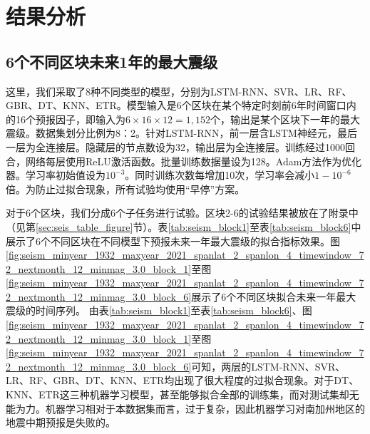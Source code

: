 \section{结果分析}\label{sec:seism_result}

\subsection{6个不同区块未来1年的最大震级}\label{sec:seism_result_6}

这里，我们采取了8种不同类型的模型，分别为LSTM-RNN、SVR、LR、RF、GBR、DT、KNN、ETR。模型输入是6个区块在某个特定时刻前6年时间窗口内的16个预报因子，即输入为$6\times 16\times 12=1,152$个，输出是某个区块下一年的最大震级。数据集划分比例为8：2。针对LSTM-RNN，前一层含LSTM神经元，最后一层为全连接层。隐藏层的节点数设为32，输出层为全连接层。训练经过1000回合，网络每层使用ReLU激活函数。批量训练数据量设为128。Adam方法作为优化器。学习率初始值设为$10^{-3}$。同时训练次数每增加10次，学习率会减小$1-10^{-6}$倍。为防止过拟合现象，所有试验均使用“早停”方案。

对于6个区块，我们分成6个子任务进行试验。区块2-6的试验结果被放在了附录中（见第\ref{sec:seis_table_figure}节）。表\ref{tab:seism_block1}至表\ref{tab:seism_block6}中展示了6个不同区块在不同模型下预报未来一年最大震级的拟合指标效果。图\ref{fig:seism_minyear_1932_maxyear_2021_spanlat_2_spanlon_4_timewindow_72_nextmonth_12_minmag_3.0_block_1}至图\ref{fig:seism_minyear_1932_maxyear_2021_spanlat_2_spanlon_4_timewindow_72_nextmonth_12_minmag_3.0_block_6}展示了6个不同区块拟合未来一年最大震级的时间序列。
由表\ref{tab:seism_block1}至表\ref{tab:seism_block6}、图\ref{fig:seism_minyear_1932_maxyear_2021_spanlat_2_spanlon_4_timewindow_72_nextmonth_12_minmag_3.0_block_1}至图\ref{fig:seism_minyear_1932_maxyear_2021_spanlat_2_spanlon_4_timewindow_72_nextmonth_12_minmag_3.0_block_6}可知，两层的LSTM-RNN、SVR、LR、RF、GBR、DT、KNN、ETR均出现了很大程度的过拟合现象。对于DT、KNN、ETR这三种机器学习模型，甚至能够拟合全部的训练集，而对测试集却无能为力。机器学习相对于本数据集而言，过于复杂，因此机器学习对南加州地区的地震中期预报是失败的。

